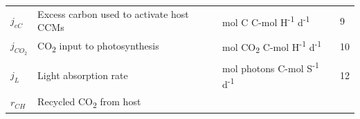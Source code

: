 \documentclass[]{elsarticle} %
\begin{document}
\begin{longtable}[c]{@{}llll@{}}
\begin{minipage}[t]{0.10\columnwidth}\raggedright\strut
\(j_{eC}\)
\strut\end{minipage} &
\begin{minipage}[t]{0.45\columnwidth}\raggedright\strut
Excess carbon used to activate host CCMs
\strut\end{minipage} &
\begin{minipage}[t]{0.27\columnwidth}\raggedright\strut
mol C C-mol H\textsuperscript{-1} d\textsuperscript{-1}
\strut\end{minipage} &
\begin{minipage}[t]{0.10\columnwidth}\raggedright\strut
9
\strut\end{minipage}\tabularnewline
\begin{minipage}[t]{0.10\columnwidth}\raggedright\strut
\(j_{CO_2}\)
\strut\end{minipage} &
\begin{minipage}[t]{0.45\columnwidth}\raggedright\strut
CO\textsubscript{2} input to photosynthesis
\strut\end{minipage} &
\begin{minipage}[t]{0.27\columnwidth}\raggedright\strut
mol CO\textsubscript{2} C-mol H\textsuperscript{-1}
d\textsuperscript{-1}
\strut\end{minipage} &
\begin{minipage}[t]{0.10\columnwidth}\raggedright\strut
10
\strut\end{minipage}\tabularnewline
\begin{minipage}[t]{0.10\columnwidth}\raggedright\strut
\(j_L\)
\strut\end{minipage} &
\begin{minipage}[t]{0.45\columnwidth}\raggedright\strut
Light absorption rate
\strut\end{minipage} &
\begin{minipage}[t]{0.27\columnwidth}\raggedright\strut
mol photons C-mol S\textsuperscript{-1} d\textsuperscript{-1}
\strut\end{minipage} &
\begin{minipage}[t]{0.10\columnwidth}\raggedright\strut
12
\strut\end{minipage}\tabularnewline
\begin{minipage}[t]{0.10\columnwidth}\raggedright\strut
\(r_{CH}\)
\strut\end{minipage} &
\begin{minipage}[t]{0.45\columnwidth}\raggedright\strut
Recycled CO\textsubscript{2} from host
\strut\end{minipage} &

\end{longtable}
\end{document}
